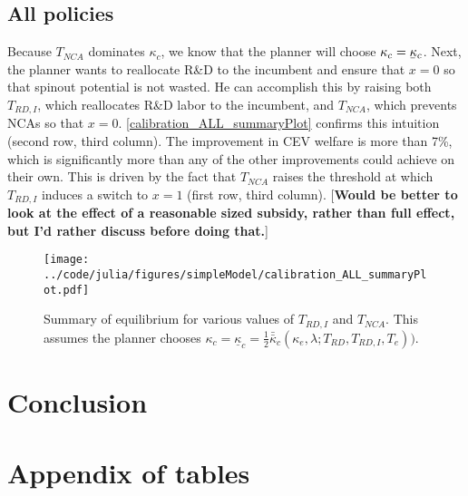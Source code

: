 \documentclass[11pt,english]{article}
\newcommand\munderbar[1]{%
	\underaccent{\bar}{#1}}
\begin{document}
\subsection{All policies}

Because $T_{NCA}$ dominates $\kappa_c$, we know that the planner will choose $\kappa_c = \munderbar{\kappa}_c$. Next, the planner wants to reallocate R\&D to the incumbent and ensure that $x = 0$ so that spinout potential is not wasted. He can accomplish this by raising both $T_{RD,I}$, which reallocates R\&D labor to the incumbent, and $T_{NCA}$, which prevents NCAs so that $x = 0$. \autoref{calibration_ALL_summaryPlot} confirms this intuition (second row, third column). The improvement in CEV welfare is more than 7\%, which is significantly more than any of the other improvements could achieve on their own. This is driven by the fact that $T_{NCA}$ raises the threshold at which $T_{RD,I}$ induces a switch to $x = 1$ (first row, third column). [\textbf{Would be better to look at the effect of a reasonable sized subsidy, rather than full effect, but I'd rather discuss before doing that.}] 

\begin{figure}[]
	\texttt{[image: ../code/julia/figures/simpleModel/calibration\_ALL\_summaryPlot.pdf]}
	\caption{Summary of equilibrium for various values of $T_{RD,I}$ and $T_{NCA}$. This assumes the planner chooses $\kappa_c = \underline{\kappa}_c = \frac{1}{2} \bar{\bar{\kappa}}_c(\kappa_e,\lambda;T_{RD},T_{RD,I},T_e))$.}
	\label{calibration_ALL_summaryPlot}
\end{figure}

\section{Conclusion}





\appendix


\section{Appendix of tables}

\setcounter{table}{0}
\renewcommand{\thetable}{\Alph{section}\arabic{table}}
\end{document}
